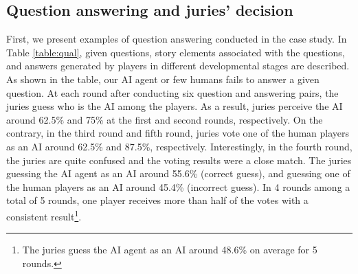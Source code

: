 \documentclass[letterpaper]{article} %
\begin{document}
\subsection{Question answering and juries' decision}
First, we present examples of question answering conducted in the case study. In Table \ref{table:qual}, given questions, story elements associated with the questions, and answers generated by players in different developmental stages are described. As shown in the table, our AI agent or few humans fails to answer a given question. At each round after conducting six question and answering pairs, the juries guess who is the AI among the players. As a result, juries perceive the AI around 62.5\% and 75\% at the first and second rounds, respectively. On the contrary, in the third round and fifth round, juries vote one of the human players as an AI around 62.5\% and 87.5\%, respectively. Interestingly, in the fourth round, the juries are quite confused and the voting results were a close match. The juries guessing the AI agent as an AI around 55.6\% (correct guess), and guessing one of the human players as an AI around 45.4\% (incorrect guess). In 4 rounds among a total of 5 rounds, one player receives more than half of the votes with a consistent result\footnote{The juries guess the AI agent as an AI around 48.6\% on average for 5 rounds.}.

\vspace{-1.60mm}
\vspace{-3.20mm}
\end{document}
